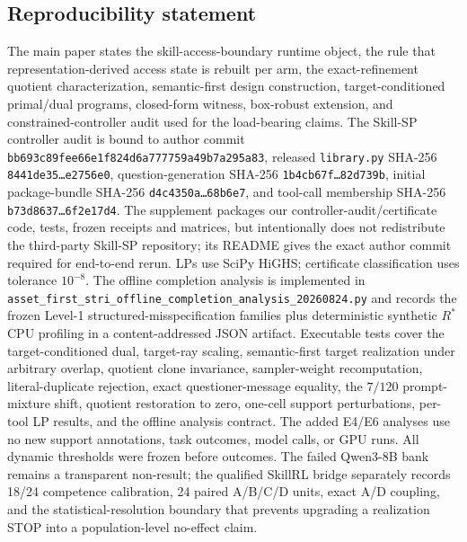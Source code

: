 \documentclass{article}
\begin{document}
\subsection*{Reproducibility statement}
The main paper states the skill-access-boundary runtime object, the rule that representation-derived access state is rebuilt per arm, the exact-refinement quotient characterization, semantic-first design construction, target-conditioned primal/dual programs, closed-form witness, box-robust extension, and constrained-controller audit used for the load-bearing claims. The Skill-SP controller audit is bound to author commit \texttt{bb693c89fee66e1f824d6a777759a49b7a295a83}, released \texttt{library.py} SHA-256 \texttt{8441de35\ldots e2756e0}, question-generation SHA-256 \texttt{1b4cb67f\ldots 82d739b}, initial package-bundle SHA-256 \texttt{d4c4350a\ldots 68b6e7}, and tool-call membership SHA-256 \texttt{b73d8637\ldots 6f2e17d4}. The supplement packages our controller-audit/certificate code, tests, frozen receipts and matrices, but intentionally does not redistribute the third-party Skill-SP repository; its README gives the exact author commit required for end-to-end rerun. LPs use SciPy HiGHS; certificate classification uses tolerance $10^{-8}$. The offline completion analysis is implemented in \texttt{asset\_first\_stri\_offline\_completion\_analysis\_20260824.py} and records the frozen Level-1 structured-misspecification families plus deterministic synthetic $R^*$ CPU profiling in a content-addressed JSON artifact. Executable tests cover the target-conditioned dual, target-ray scaling, semantic-first target realization under arbitrary overlap, quotient clone invariance, sampler-weight recomputation, literal-duplicate rejection, exact questioner-message equality, the $7/120$ prompt-mixture shift, quotient restoration to zero, one-cell support perturbations, per-tool LP results, and the offline analysis contract. The added E4/E6 analyses use no new support annotations, task outcomes, model calls, or GPU runs. All dynamic thresholds were frozen before outcomes. The failed Qwen3-8B bank remains a transparent non-result; the qualified SkillRL bridge separately records 18/24 competence calibration, 24 paired A/B/C/D units, exact A/D coupling, and the statistical-resolution boundary that prevents upgrading a realization STOP into a population-level no-effect claim.



\end{document}
